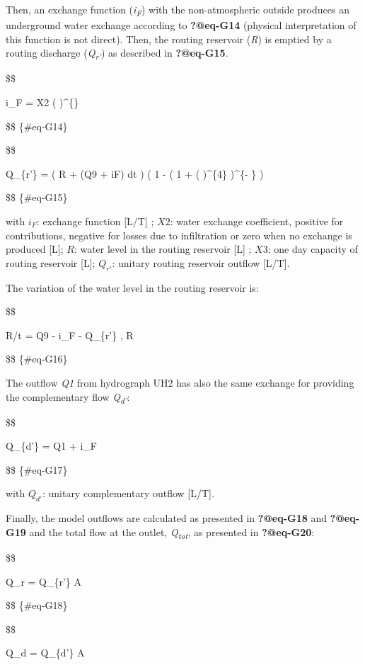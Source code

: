 \documentclass[
  letterpaper,
  DIV=11,
  numbers=noendperiod]{scrreprt}
\begin{document}
Then, an exchange function (\emph{i\textsubscript{F}}) with the
non-atmospheric outside produces an underground water exchange according
to \textbf{?@eq-G14} (physical interpretation of this function is not
direct). Then, the routing reservoir (\emph{R}) is emptied by a routing
discharge (\emph{Q\textsubscript{r'}}) as described in
\textbf{?@eq-G15}.

\$\$

i\_F = X2 \cdot \bigg( 
\bigg)\^{}\{\}

\$\$ \{\#eq-G14\}

\$\$

Q\_\{r'\} =  \big( R + (Q9 + iF) \cdot dt
\big) \cdot \Bigg( 1 - \bigg( 1 + \Big(
 \Big)\^{}\{4\} \bigg)\^{}\{-
\} \Bigg)

\$\$ \{\#eq-G15\}

with \(i_F\): exchange function {[}L/T{]} ; \(X2\): water exchange
coefficient, positive for contributions, negative for losses due to
infiltration or zero when no exchange is produced {[}L{]}; \(R\): water
level in the routing reservoir {[}L{]} ; \(X3\): one day capacity of
routing reservoir {[}L{]}; \(Q_{r'}\): unitary routing reservoir outflow
{[}L/T{]}.

The variation of the water level in the routing reservoir is:

\$\$

R/t = Q9 - i\_F - Q\_\{r'\} , \quad R 

\$\$ \{\#eq-G16\}

The outflow \emph{Q1} from hydrograph UH2 has also the same exchange for
providing the complementary flow \emph{Q\textsubscript{d'}}:

\$\$

Q\_\{d'\} = Q1 + i\_F

\$\$ \{\#eq-G17\}

with \(Q_{d'}\): unitary complementary outflow {[}L/T{]}.

Finally, the model outflows are calculated as presented in
\textbf{?@eq-G18} and \textbf{?@eq-G19} and the total flow at the
outlet, \emph{Q\textsubscript{tot}}, as presented in \textbf{?@eq-G20}:

\$\$

Q\_r = Q\_\{r'\} \cdot A

\$\$ \{\#eq-G18\}

\$\$

Q\_d = Q\_\{d'\} \cdot A
\end{document}
